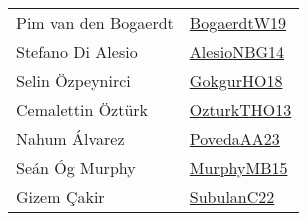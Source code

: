 {\begin{longtable}{p{4cm}p{20cm}}
Pim van den Bogaerdt & \href{papers/BogaerdtW19.pdf}{BogaerdtW19}\cite{BogaerdtW19} \\
Stefano {Di Alesio} & \href{papers/AlesioNBG14.pdf}{AlesioNBG14}\cite{AlesioNBG14} \\
Selin {\"{O}}zpeynirci & \href{}{GokgurHO18}\cite{GokgurHO18} \\
Cemalettin {\"{O}}zt{\"{u}}rk & \href{articles/OzturkTHO13.pdf}{OzturkTHO13}\cite{OzturkTHO13} \\
Nahum {\'{A}}lvarez & \href{papers/PovedaAA23.pdf}{PovedaAA23}\cite{PovedaAA23} \\
Se{\'{a}}n {\'{O}}g Murphy & \href{papers/MurphyMB15.pdf}{MurphyMB15}\cite{MurphyMB15} \\
Gizem {\c{C}}akir & \href{articles/SubulanC22.pdf}{SubulanC22}\cite{SubulanC22} \\
\end{longtable}
}

